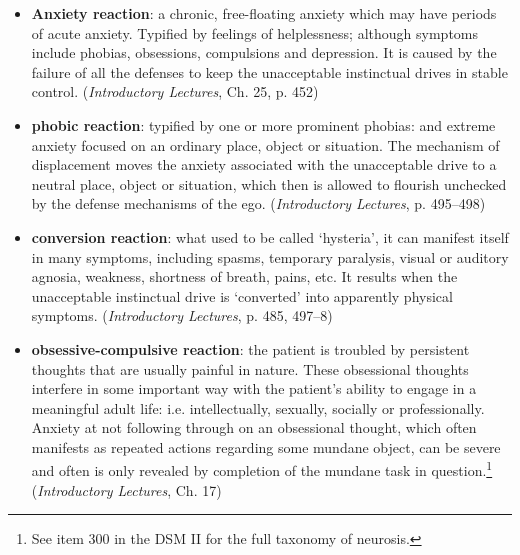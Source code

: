 \begin{refsection}
\begin{itemize}
\item \textbf{Anxiety reaction}: a chronic, free-floating anxiety which may have periods of acute anxiety. Typified by feelings of helplessness; although symptoms include phobias, obsessions, compulsions and depression. It is caused by the failure of all the defenses to keep the unacceptable instinctual drives in stable control. (\emph{Introductory Lectures}, Ch. 25, p. 452)

\item \textbf{phobic reaction}: typified by one or more prominent phobias: and extreme anxiety focused on an ordinary place, object or situation. The mechanism of displacement moves the anxiety associated with the unacceptable drive to a neutral place, object or situation, which then is allowed to flourish unchecked by the defense mechanisms of the ego. (\emph{Introductory Lectures}, p. 495--498)

\item \textbf{conversion reaction}: what used to be called `hysteria', it can manifest itself in many symptoms, including spasms, temporary paralysis, visual or auditory agnosia, weakness, shortness of breath, pains, etc. It results when the unacceptable instinctual drive is `converted' into apparently physical symptoms. (\emph{Introductory Lectures}, p. 485, 497--8)

\item \textbf{obsessive-compulsive reaction}: the patient is troubled by persistent thoughts that are usually painful in nature. These obsessional thoughts interfere in some important way with the patient's ability to engage in a meaningful adult life: i.e. intellectually, sexually, socially or professionally. Anxiety at not following through on an obsessional thought, which often manifests as repeated actions regarding some mundane object, can be severe and often is only revealed by completion of the mundane task in question.\footnote{See item 300 in the DSM II for the full taxonomy of neurosis.} (\emph{Introductory Lectures}, Ch. 17)

\end{itemize}


\end{refsection}
